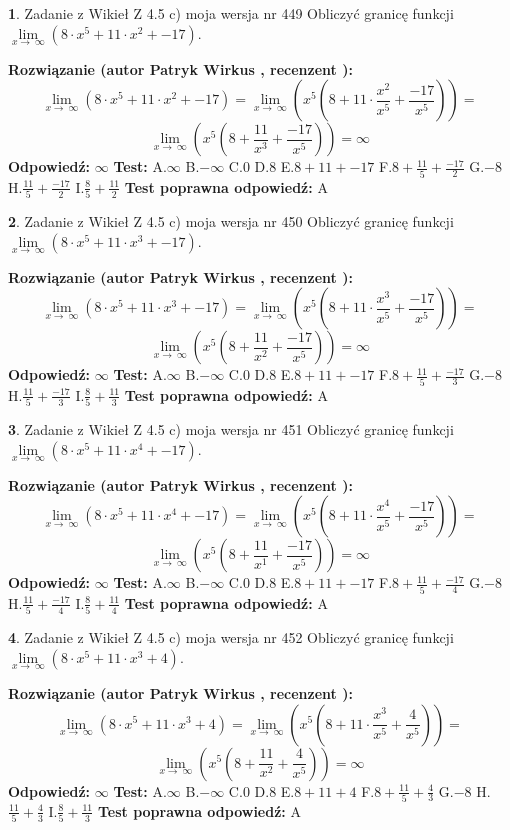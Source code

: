 \documentclass[12pt, a4paper]{article}
\theoremstyle{definition} %
\newtheorem{zad}{}
\newcommand{\zadStart}[1]{\begin{zad}#1\newline}
\newcommand{\zadStop}{\end{zad}}
\newcommand{\rozwStart}[2]{\noindent \textbf{Rozwiązanie (autor #1 , recenzent #2): }\newline}
\newcommand{\rozwStop}{\newline}
\newcommand{\odpStart}{\noindent \textbf{Odpowiedź:}\newline}
\newcommand{\odpStop}{\newline}
\newcommand{\testStart}{\noindent \textbf{Test:}\newline}
\newcommand{\testStop}{\newline}
\newcommand{\kluczStart}{\noindent \textbf{Test poprawna odpowiedź:}\newline}
\newcommand{\kluczStop}{\newline}
\begin{document}
\zadStart{Zadanie z Wikieł Z 4.5 c) moja wersja nr 449}
Obliczyć granicę funkcji  $\lim\limits_{x\to\ \infty}(8 \cdot x^{5}+11 \cdot x^{2}+-17)$.
\zadStop
\rozwStart{Patryk Wirkus}{}
$$\lim\limits_{x\to\ \infty}(8 \cdot x^{5}+11 \cdot x^{2}+-17) = \lim\limits_{x\to\ \infty}(x^{5}(8 +11 \cdot \frac{x^{2}}{x^{5}}+\frac{-17}{x^{5}})) =$$ $$\lim\limits_{x\to\ \infty}(x^{5}(8 +\frac{11}{x^{3}}+\frac{-17}{x^{5}})) =\infty$$
\rozwStop
\odpStart
$\infty$
\odpStop
\testStart
A.$\infty$ B.$-\infty$ C.$0$ D.$8$ E.$8 + 11 + -17$
F.$8+\frac{11}{5}+\frac{-17}{2}$ G.$-8$
H.$\frac{11}{5}+\frac{-17}{2}$
I.$\frac{8}{5}+\frac{11}{2}$
\testStop
\kluczStart
A
\kluczStop



\zadStart{Zadanie z Wikieł Z 4.5 c) moja wersja nr 450}
Obliczyć granicę funkcji  $\lim\limits_{x\to\ \infty}(8 \cdot x^{5}+11 \cdot x^{3}+-17)$.
\zadStop
\rozwStart{Patryk Wirkus}{}
$$\lim\limits_{x\to\ \infty}(8 \cdot x^{5}+11 \cdot x^{3}+-17) = \lim\limits_{x\to\ \infty}(x^{5}(8 +11 \cdot \frac{x^{3}}{x^{5}}+\frac{-17}{x^{5}})) =$$ $$\lim\limits_{x\to\ \infty}(x^{5}(8 +\frac{11}{x^{2}}+\frac{-17}{x^{5}})) =\infty$$
\rozwStop
\odpStart
$\infty$
\odpStop
\testStart
A.$\infty$ B.$-\infty$ C.$0$ D.$8$ E.$8 + 11 + -17$
F.$8+\frac{11}{5}+\frac{-17}{3}$ G.$-8$
H.$\frac{11}{5}+\frac{-17}{3}$
I.$\frac{8}{5}+\frac{11}{3}$
\testStop
\kluczStart
A
\kluczStop



\zadStart{Zadanie z Wikieł Z 4.5 c) moja wersja nr 451}
Obliczyć granicę funkcji  $\lim\limits_{x\to\ \infty}(8 \cdot x^{5}+11 \cdot x^{4}+-17)$.
\zadStop
\rozwStart{Patryk Wirkus}{}
$$\lim\limits_{x\to\ \infty}(8 \cdot x^{5}+11 \cdot x^{4}+-17) = \lim\limits_{x\to\ \infty}(x^{5}(8 +11 \cdot \frac{x^{4}}{x^{5}}+\frac{-17}{x^{5}})) =$$ $$\lim\limits_{x\to\ \infty}(x^{5}(8 +\frac{11}{x^{1}}+\frac{-17}{x^{5}})) =\infty$$
\rozwStop
\odpStart
$\infty$
\odpStop
\testStart
A.$\infty$ B.$-\infty$ C.$0$ D.$8$ E.$8 + 11 + -17$
F.$8+\frac{11}{5}+\frac{-17}{4}$ G.$-8$
H.$\frac{11}{5}+\frac{-17}{4}$
I.$\frac{8}{5}+\frac{11}{4}$
\testStop
\kluczStart
A
\kluczStop



\zadStart{Zadanie z Wikieł Z 4.5 c) moja wersja nr 452}
Obliczyć granicę funkcji  $\lim\limits_{x\to\ \infty}(8 \cdot x^{5}+11 \cdot x^{3}+4)$.
\zadStop
\rozwStart{Patryk Wirkus}{}
$$\lim\limits_{x\to\ \infty}(8 \cdot x^{5}+11 \cdot x^{3}+4) = \lim\limits_{x\to\ \infty}(x^{5}(8 +11 \cdot \frac{x^{3}}{x^{5}}+\frac{4}{x^{5}})) =$$ $$\lim\limits_{x\to\ \infty}(x^{5}(8 +\frac{11}{x^{2}}+\frac{4}{x^{5}})) =\infty$$
\rozwStop
\odpStart
$\infty$
\odpStop
\testStart
A.$\infty$ B.$-\infty$ C.$0$ D.$8$ E.$8 + 11 + 4$
F.$8+\frac{11}{5}+\frac{4}{3}$ G.$-8$
H.$\frac{11}{5}+\frac{4}{3}$
I.$\frac{8}{5}+\frac{11}{3}$
\testStop
\kluczStart
A
\kluczStop
\end{document}
